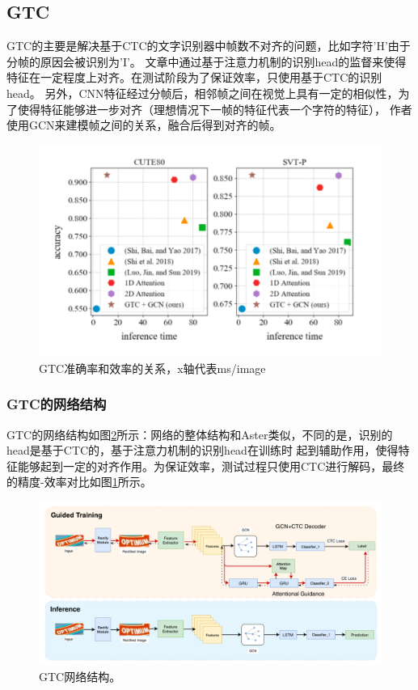 \subsection{GTC}
GTC\cite{hu2020gtc}的主要是解决基于CTC的文字识别器中帧数不对齐的问题，比如字符'H'由于分帧的原因会被识别为'I'。
文章中通过基于注意力机制的识别head的监督来使得特征在一定程度上对齐。在测试阶段为了保证效率，只使用基于CTC的识别head。
另外，CNN特征经过分帧后，相邻帧之间在视觉上具有一定的相似性，为了使得特征能够进一步对齐（理想情况下一帧的特征代表一个字符的特征），
作者使用GCN来建模帧之间的关系，融合后得到对齐的帧。
\begin{figure}[H]
    \centering
    \includegraphics[width=.8\textwidth]{figure/recognition/gtc_introduction.png} 
    \caption{GTC准确率和效率的关系，x轴代表ms/image} 
    \label{gtc_introduction} 
\end{figure}

\subsubsection{GTC的网络结构}
GTC的网络结构如图\ref{gtc_framework}所示：网络的整体结构和Aster类似，不同的是，识别的head是基于CTC的，基于注意力机制的识别head在训练时
起到辅助作用，使得特征能够起到一定的对齐作用。为保证效率，测试过程只使用CTC进行解码，最终的精度-效率对比如图\ref{gtc_introduction}所示。
\begin{figure}[H]
    \centering
    \includegraphics[width=.98\textwidth]{figure/recognition/gtc_framework.png} 
    \caption{GTC网络结构。} 
    \label{gtc_framework} 
\end{figure}


